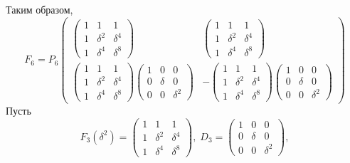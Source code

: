 Таким образом,
\[
    F_6
    = P_6
    \begin{pmatrix}
        \begin{pmatrix}
            1 & 1        & 1        \\
            1 & \delta^2 & \delta^4 \\
            1 & \delta^4 & \delta^8
        \end{pmatrix}
        &
        \begin{pmatrix}
            1 & 1        & 1        \\
            1 & \delta^2 & \delta^4 \\
            1 & \delta^4 & \delta^8
        \end{pmatrix}
        \\
        \begin{pmatrix}
            1 & 1        & 1        \\
            1 & \delta^2 & \delta^4 \\
            1 & \delta^4 & \delta^8
        \end{pmatrix}
        \begin{pmatrix}
            1 & 0      & 0        \\
            0 & \delta & 0        \\
            0 & 0      & \delta^2
        \end{pmatrix}
        &
        -
        \begin{pmatrix}
            1 & 1        & 1        \\
            1 & \delta^2 & \delta^4 \\
            1 & \delta^4 & \delta^8
        \end{pmatrix}
        \begin{pmatrix}
            1 & 0      & 0        \\
            0 & \delta & 0        \\
            0 & 0      & \delta^2
        \end{pmatrix}
    \end{pmatrix}
\]
Пусть
\[
    F_3(\delta^2)
    = \begin{pmatrix}
          1 & 1        & 1        \\
          1 & \delta^2 & \delta^4 \\
          1 & \delta^4 & \delta^8
    \end{pmatrix},
    \;
    D_3
    = \begin{pmatrix}
          1 & 0      & 0        \\
          0 & \delta & 0        \\
          0 & 0      & \delta^2
    \end{pmatrix} ,
\]
